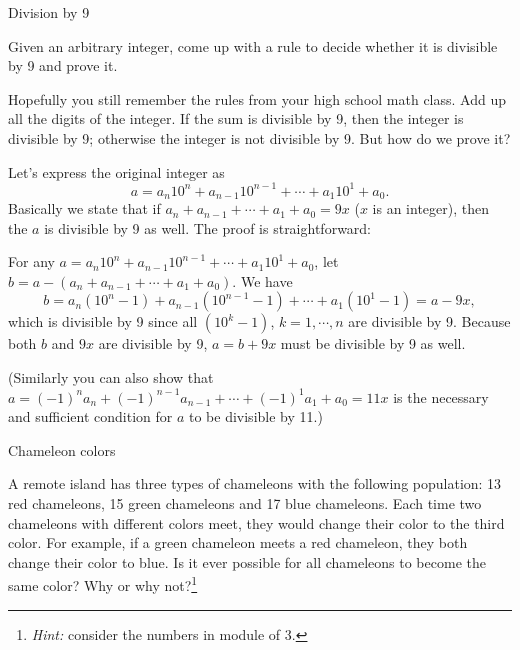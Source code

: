 \begin{problem}{Division by 9}

Given an arbitrary integer, come up with a rule to decide whether it is divisible by 9 and
prove it.
\end{problem}

\begin{solution}
Hopefully you still remember the rules from your high school math class.
Add up all the digits of the integer. If the sum is divisible by 9, then the integer is divisible
by 9; otherwise the integer is not divisible by 9. But how do we prove it?

Let's express the original integer as
\[
a=a_n10^n+a_{n-1}10^{n-1}+\cdots+a_1 10^1+a_0.
\]
Basically we state that if $a_n+a_{n-1}+\cdots+a_1+a_0=9x$ ($x$ is an integer), then the
$a$ is divisible by 9 as well. The proof is straightforward:

For any $a=a_n10^n+a_{n-1}10^{n-1}+\cdots+a_1 10^1+a_0$, let
$b=a-(a_n+a_{n-1}+\cdots+a_1+a_0)$. We have
\[
b=a_n(10^n-1)+a_{n-1}(10^{n-1}-1)+\cdots+a_1(10^1-1)=a-9x,
\]
which is divisible by 9 since all $(10^k-1)$, $k=1,\cdots,n$ are divisible by 9. Because
both $b$ and $9x$ are divisible by 9, $a=b+9x$ must be divisible by 9 as well.

(Similarly you can also show that
$a=(-1)^n a_n+(-1)^{n-1}a_{n-1}+\cdots+(-1)^1a_1+a_0=11x$ is the necessary and
sufficient condition for $a$ to be divisible by 11.)
\end{solution}

\begin{problem}{Chameleon colors}

A remote island has three types of chameleons with the following population: 13 red
chameleons, 15 green chameleons and 17 blue chameleons. Each time two chameleons
with different colors meet, they would change their color to the third color. For example,
if a green chameleon meets a red chameleon, they both change their color to blue. Is it ever
possible for all chameleons to become the same color? Why or why not?\footnote[16]{\emph{Hint:} consider the numbers in module of 3.}
\end{problem}

